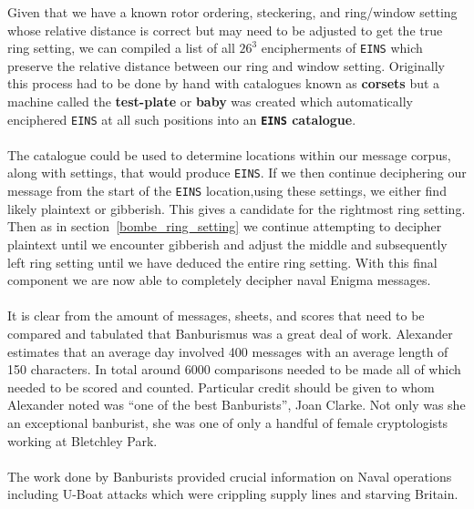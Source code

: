 \noindent Given that we have a known rotor ordering, steckering, and ring/window setting whose relative distance is correct but may need to be adjusted to get the true ring setting, we can compiled a list of all $26^3$ encipherments of \texttt{EINS} which preserve the relative distance between our ring and window setting. Originally this process had to be done by hand with catalogues known as {\bf{corsets}} but a machine called the {\bf{test-plate}} or {\bf{baby}} was created which automatically enciphered \texttt{EINS} at all such positions into an {\bf{\texttt{EINS} catalogue}}.
\\\\The catalogue could be used to determine locations within our message corpus, along with settings, that would produce \texttt{EINS}. If we then continue deciphering our message from the start of the \texttt{EINS} location,using these settings, we either find likely plaintext or gibberish. This gives a candidate for the rightmost ring setting. Then as in section~\ref{bombe_ring_setting} we continue attempting to decipher plaintext until we encounter gibberish and adjust the middle and subsequently left ring setting until we have deduced the entire ring setting. With this final component we are now able to completely decipher naval Enigma messages.
\\\\It is clear from the amount of messages, sheets, and scores that need to be compared and tabulated that Banburismus was a great deal of work. Alexander estimates that an average day involved 400 messages with an average length of 150 characters. In total around 6000 comparisons needed to be made all of which needed to be scored and counted. Particular credit should be given to whom Alexander noted was ``one of the best Banburists'', Joan Clarke. Not only was she an exceptional banburist, she was one of only a handful of female cryptologists working at Bletchley Park.
\\\\The work done by Banburists provided crucial information on Naval operations including U-Boat attacks which were crippling supply lines and starving Britain.


